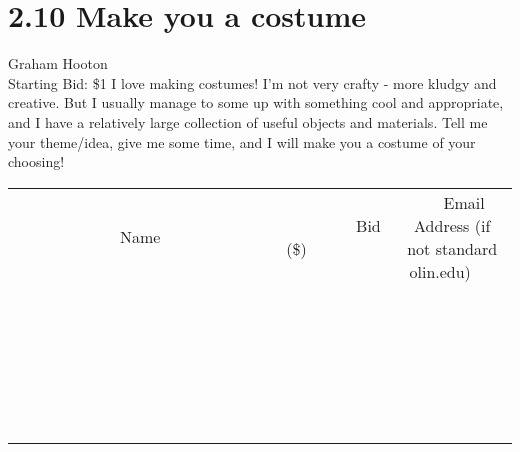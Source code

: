 \documentclass[11pt]{article}
\begin{document}
\section*{2.10 Make you a costume}
Graham Hooton
\\
Starting Bid: \$1
\newline
I love making costumes! I'm not very crafty - more kludgy and creative. But I usually manage to some up with something cool and appropriate, and I have a relatively large collection of useful objects and materials. Tell me your theme/idea, give me some time, and I will make you a costume of your choosing!
\\[6ex]
\begin{tabular}{c c c}
~~~~~~~~~~~~~Name~~~~~~~~~~~~~ & ~~~~~~~~~Bid (\$)~~~~~~~~~  & ~~~Email Address (if not standard olin.edu)~~~\\
 & & \\
\hline
 & & \\
\hline
 & & \\
\hline
 & & \\
\hline
 & & \\
\hline
 & & \\
\hline
 & & \\
\hline
 & & \\
\hline
 & & \\
\hline
 & & \\
\hline
 & & \\
\hline
 & & \\
\hline
 & & \\
\hline
 & & \\
\hline
 & & \\
\hline
 & & \\
\hline
 & & \\
\hline
 & & \\
\hline
 & & \\
\hline
 & & \\
\hline
 & & \\
\hline
 & & \\
\hline
 & & \\
\hline
 & & \\
\hline
 & & \\
\hline
 & & \\
\hline
\end{tabular}
\newpage
\end{document}
